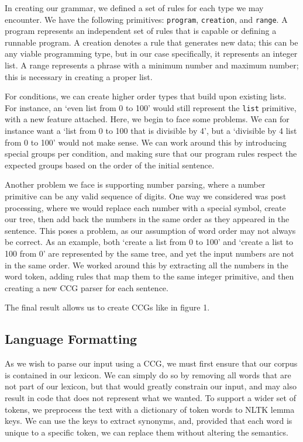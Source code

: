\documentclass[11pt,letterpaper]{article}
\begin{document}
In creating our grammar, we defined a set of rules for each type we may encounter. 
We have the following primitives: {\small\verb|program|}, {\small\verb|creation|}, and {\small\verb|range|}.
A program represents an independent set of rules that is capable or defining a runnable program.
A creation denotes a rule that generates new data;
this can be any viable programming type, but in our case specifically, it represents an integer list.
A range represents a phrase with a minimum number and maximum number;
this is necessary in creating a proper list.

For conditions, we can create higher order types that build upon existing lists.
For instance, an `even list from 0 to 100' would still represent the {\small\verb|list|} primitive, with a new feature attached.
Here, we begin to face some problems.
We can for instance want a `list from 0 to 100 that is divisible by 4', but a `divisible by 4 list from 0 to 100' would not make sense.
We can work around this by introducing special groups per condition, and making sure that our program rules respect the expected groups based on the order of the initial sentence.

Another problem we face is supporting number parsing, where a number primitive can be any valid sequence of digits. 
One way we considered was post processing, where we would replace each number with a special symbol, create our tree, then add back the numbers in the same order as they appeared in the sentence.
This poses a problem, as our assumption of word order may not always be correct. As an example, both `create a list from 0 to 100' and `create a list to 100 from 0' are represented by the same tree, and yet the input numbers are not in the same order.
We worked around this by extracting all the numbers in the word token, adding rules that map them to the same integer primitive, and then creating a new CCG parser for each sentence.

The final result allows us to create CCGs like in figure 1.

\subsection{Language Formatting}

As we wish to parse our input using a CCG, we must first ensure that our corpus is contained in our lexicon.
We can simply do so by removing all words that are not part of our lexicon, but that would greatly constrain our input, and may also result in code that does not represent what we wanted.
To support a wider set of tokens, we preprocess the text with a dictionary of token words to NLTK lemma keys.
We can use the keys to extract synonyms, and, provided that each word is unique to a specific token, we can replace them without altering the semantics.
\end{document}
